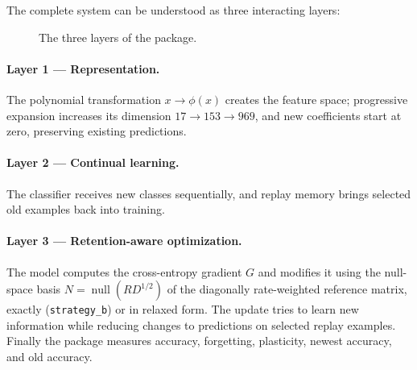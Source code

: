 \documentclass[11pt,a4paper]{article}
\DeclareMathOperator{\Null}{null}
\newcommand{\code}[1]{\texttt{#1}}
\begin{document}
The complete system can be understood as three interacting layers:

\begin{figure}[h]
\centering
{}
\caption{The three layers of the package.}\label{fig:layers}
\end{figure}

\paragraph{Layer 1 --- Representation.} The polynomial transformation $x\longrightarrow\phi(x)$ creates the feature space; progressive expansion increases its dimension $17\to153\to969$, and new coefficients start at zero, preserving existing predictions.

\paragraph{Layer 2 --- Continual learning.} The classifier receives new classes sequentially, and replay memory brings selected old examples back into training.

\paragraph{Layer 3 --- Retention-aware optimization.} The model computes the cross-entropy gradient $G$ and modifies it using the null-space basis $N=\Null(RD^{1/2})$ of the diagonally rate-weighted reference matrix, exactly (\code{strategy\_b}) or in relaxed form. The update tries to learn new information while reducing changes to predictions on selected replay examples. Finally the package measures accuracy, forgetting, plasticity, newest accuracy, and old accuracy.
\end{document}
